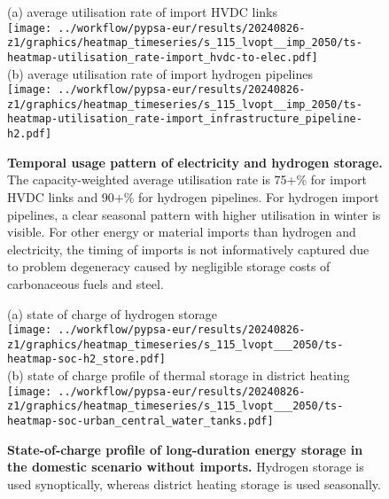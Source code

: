 \begin{figure*}
    \centering
    \footnotesize
    (a) average utilisation rate of import HVDC links \\
    \texttt{[image: ../workflow/pypsa-eur/results/20240826-z1/graphics/heatmap\_timeseries/s\_115\_lvopt\_\_imp\_2050/ts-heatmap-utilisation\_rate-import\_hvdc-to-elec.pdf]} \\
    (b) average utilisation rate of import hydrogen pipelines \\
    \texttt{[image: ../workflow/pypsa-eur/results/20240826-z1/graphics/heatmap\_timeseries/s\_115\_lvopt\_\_imp\_2050/ts-heatmap-utilisation\_rate-import\_infrastructure\_pipeline-h2.pdf]}
    \caption{\textbf{Temporal usage pattern of electricity and hydrogen storage.}
    The capacity-weighted average utilisation rate is 75+\% for import HVDC links
    and 90+\% for hydrogen pipelines. For hydrogen import pipelines, a clear
    seasonal pattern with higher utilisation in winter is visible. For other
    energy or material imports than hydrogen and electricity, the timing of
    imports is not informatively captured due to problem degeneracy caused by
    negligible storage costs of carbonaceous fuels and steel.}
    \label{fig:si:import-operation}
\end{figure*}

\begin{figure*}
    \centering
    \footnotesize
    (a) state of charge of hydrogen storage \\
    \texttt{[image: ../workflow/pypsa-eur/results/20240826-z1/graphics/heatmap\_timeseries/s\_115\_lvopt\_\_\_2050/ts-heatmap-soc-h2\_store.pdf]} \\
    (b) state of charge profile of thermal storage in district heating \\
    \texttt{[image: ../workflow/pypsa-eur/results/20240826-z1/graphics/heatmap\_timeseries/s\_115\_lvopt\_\_\_2050/ts-heatmap-soc-urban\_central\_water\_tanks.pdf]}
    \caption{\textbf{State-of-charge profile of long-duration energy storage in
    the domestic scenario without imports.} Hydrogen storage is used
    synoptically, whereas district heating storage is used seasonally.}
    \label{fig:si:storage-operation}
\end{figure*}

